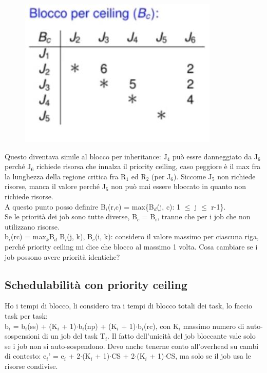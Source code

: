 \documentclass[12pt, oneside]{extbook}
\begin{document}
\begin{figure}[!h]
\centering
\includegraphics[scale=0.4]{immagini/image-031.jpg}
\end{figure}
Questo diventava simile al blocco per inheritance: J$_{4}$ può essre danneggiato da J$_{6}$ perché J$_{6}$ richiede risorsa che innalza il priority ceiling, caso peggiore è il max fra la lunghezza della regione critica fra R$_{1}$ ed R$_{2}$ (per J$_{6}$). Siccome J$_{5}$ non richiede risorse, manca il valore perché J$_{5}$ non può mai essere bloccato in quanto non richiede risorse.\\ A questo punto posso definire B$_{i}$(r,c) = max\{B$_{d}$(j, c): 1 $\leq$ j $\leq$ r-1\}.\\ Se le priorità dei job sono tutte diverse, B$_{c}$ = B$_{i}$, tranne che per i job che non utilizzano risorse.\\ b$_{i}$(rc) = max$_{k}${B$_{d}$ B$_{i}$(j, k), B$_{c}$(i, k)}: considero il valore massimo per ciascuna riga, perché priority ceiling mi dice che blocco al massimo 1 volta. Cosa cambiare se i job possono avere priorità identiche?
\subsection{Schedulabilità con priority ceiling}
Ho i tempi di blocco, li considero tra i tempi di blocco totali dei task, lo faccio task per task:\\
b$_{i}$ = b$_{i}$(ss) + (K$_{i}$ + 1)$\cdot$b$_{i}$(np) + (K$_{i}$ + 1)$\cdot$b$_{i}$(rc), con K$_{i}$ massimo numero di auto-sospensioni di un job del task T$_{i}$. Il fatto dell'unicità del job bloccante vale solo se i job non si auto-sospendono. Devo anche tenerne conto all'overhead su cambi di contesto: e$_{i}$' = e$_{i}$ + 2$\cdot$(K$_{i}$ + 1)$\cdot$CS + 2$\cdot$(K$_{i}$ + 1)$\cdot$CS, ma solo se il job usa le risorse condivise.
\end{document}
